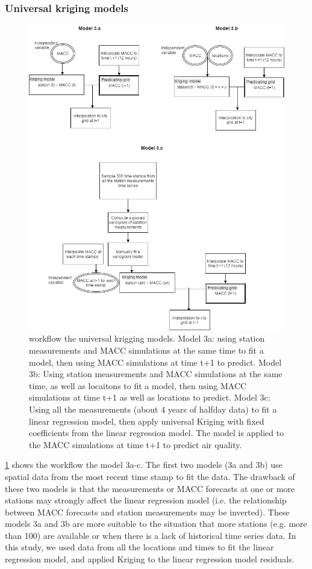 \documentclass{article}
\begin{document}
\subsubsection{Universal kriging models}

\begin{figure}
\includegraphics[width=\columnwidth]{diaM3.png}
\caption{workflow the universal krigging models. Model 3a: using station measurements and MACC simulations at the same time to fit a model, then using MACC simulations at time t+1 to predict. Model 3b: Using station measurements and MACC simulations at the same time, as well as locaitons to fit a model, then using MACC simulations at time t+1 as well as locations to predict. Model 3c: Using all the measurements (about 4 years of halfday data) to fit a linear regression model, then apply universal Kriging with fixed coefficients from the linear regression model. The model is applied to the MACC simulations at time t+1 to predict air quality.}
\label{fig:UK}
\end{figure}

\cref{fig:UK} shows the workflow the model 3a-c. The first two models (3a and 3b) use spatial data from the most recent time stamp to fit the data. The drawback of these two models is that the measurements or MACC forecasts at one or more stations may strongly affect the linear regression model (i.e. the relationship between MACC forecasts and station measurements may be inverted). These models 3a and 3b are more suitable to the situation that more stations (e.g. more than 100) are available or when there is a lack of historical time series data. In this study, we used data from all the locations and times to fit the linear regression model, and applied Kriging to the linear regression model residuals.
\end{document}
